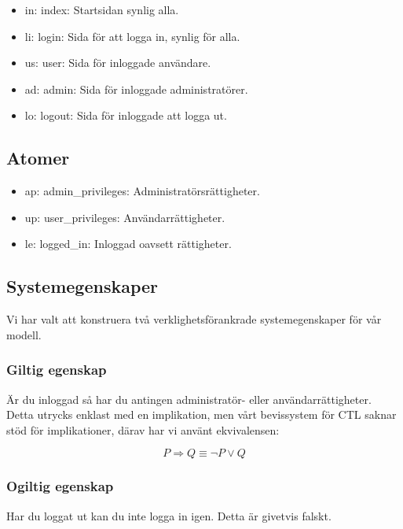 \documentclass{article}
\begin{document}
  \begin{itemize}

    \item in: index: Startsidan synlig alla.
    \item li: login: Sida för att logga in, synlig för alla.
    \item us: user: Sida för inloggade användare.
    \item ad: admin: Sida för inloggade administratörer. 
    \item lo: logout: Sida för inloggade att logga ut. 

  \end{itemize}

  \subsection{Atomer}

  \begin{itemize}

    \item ap: admin\_privileges: Administratörsrättigheter.
    \item up: user\_privileges: Användarrättigheter.
    \item le: logged\_in: Inloggad oavsett rättigheter.

  \end{itemize}


  \newpage

  \subsection{Systemegenskaper}
  Vi har valt att konstruera två verklighetsförankrade systemegenskaper för vår
  modell. 

  \subsubsection{Giltig egenskap}
  Är du inloggad så har du antingen administratör- eller användarrättigheter.
  Detta utrycks enklast med en implikation, men vårt bevissystem för CTL saknar
  stöd för implikationer, därav har vi använt ekvivalensen:

  $$
  P \Rightarrow Q \equiv \neg P \lor Q
  $$

  \begin{figure}[h!]
    
  \end{figure}


  \subsubsection{Ogiltig egenskap}
  Har du loggat ut kan du inte logga in igen. Detta är givetvis falskt.
\end{document}
